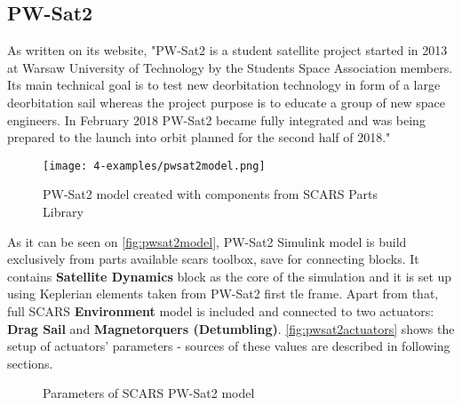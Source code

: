 




    \subsection{PW-Sat2}\label{sec:pwsat2}
        As written on its website, "PW-Sat2 is a student satellite project started in 2013 at Warsaw University of Technology by the Students Space Association members. Its main technical goal is to test new deorbitation technology in form of a large deorbitation sail whereas the project purpose is to educate a group of new space engineers. In February 2018 PW-Sat2 became fully integrated and was being prepared to the launch into orbit planned for the second half of 2018."\cite{pwsat2website}
                         
        \begin{figure}[H]
            \centering
            \texttt{[image: 4-examples/pwsat2model.png]}
            \caption{PW-Sat2 model created with components from SCARS Parts Library}
            \label{fig:pwsat2model}
        \end{figure}

        As it can be seen on \autoref{fig:pwsat2model}, PW-Sat2 Simulink model is build exclusively from parts available \ac{scars} toolbox, save for connecting blocks. It contains \textbf{Satellite Dynamics} block as the core of the simulation and it is set up using Keplerian elements taken from PW-Sat2 first \ac{tle} frame. Apart from that, full SCARS \textbf{Environment} model is included and connected to two actuators: \textbf{Drag Sail} and \textbf{Magnetorquers (Detumbling)}. \autoref{fig:pwsat2actuators} shows the setup of actuators' parameters - sources of these values are described in following sections. 

        
        \begin{figure}[H]
            \centering
            \qquad
            \caption{Parameters of SCARS PW-Sat2 model}%
            \label{fig:pwsat2actuators}%
        \end{figure}

